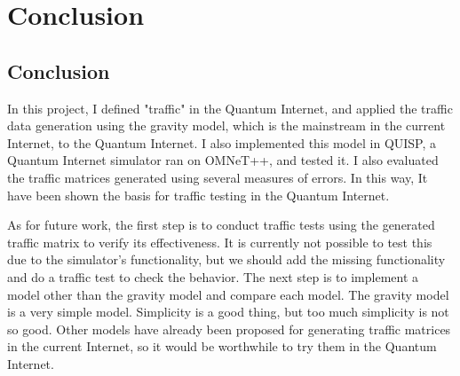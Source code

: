 \chapter{Conclusion}
\label{conclusion}
\section{Conclusion}
In this project, I defined "traffic" in the Quantum Internet, and applied the traffic data generation using the gravity model, which is the mainstream in the current Internet, to the Quantum Internet.
I also implemented this model in QUISP, a Quantum Internet simulator ran on OMNeT++, and tested it.
I also evaluated the traffic matrices generated using several measures of errors.
In this way, It have been shown the basis for traffic testing in the Quantum Internet.

As for future work, the first step is to conduct traffic tests using the generated traffic matrix to verify its effectiveness.
It is currently not possible to test this due to the simulator's functionality, but we should add the missing functionality and do a traffic test to check the behavior.
The next step is to implement a model other than the gravity model and compare each model.
The gravity model is a very simple model. 
Simplicity is a good thing, but too much simplicity is not so good.
Other models have already been proposed for generating traffic matrices in the current Internet, so it would be worthwhile to try them in the Quantum Internet.
